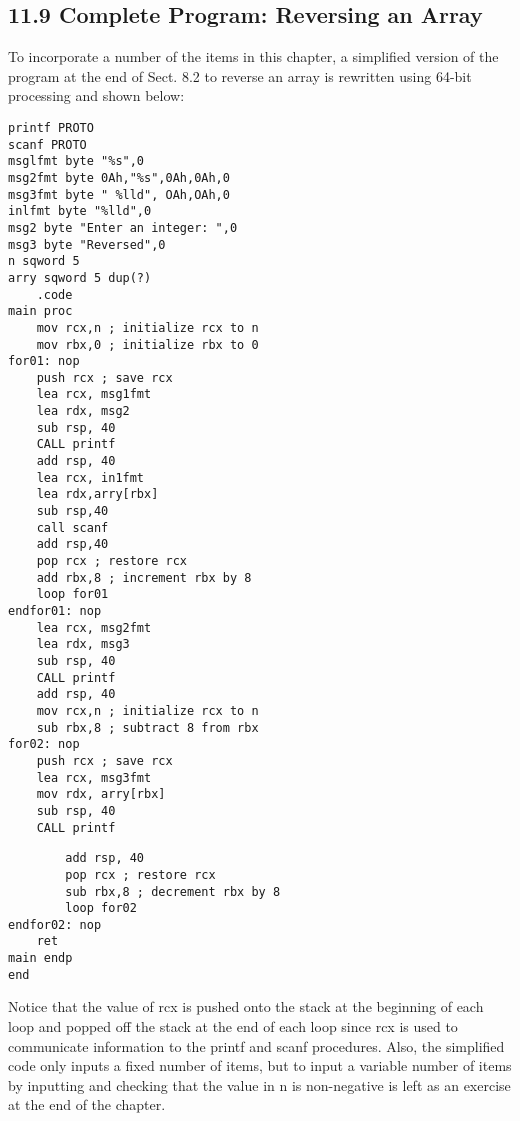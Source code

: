 \documentclass[10pt]{article}
\begin{document}
\subsection*{11.9 Complete Program: Reversing an Array}
To incorporate a number of the items in this chapter, a simplified version of the program at the end of Sect. 8.2 to reverse an array is rewritten using 64-bit processing and shown below:

\begin{verbatim}
printf PROTO
scanf PROTO
msglfmt byte "%s",0
msg2fmt byte 0Ah,"%s",0Ah,0Ah,0
msg3fmt byte " %lld", OAh,OAh,0
inlfmt byte "%lld",0
msg2 byte "Enter an integer: ",0
msg3 byte "Reversed",0
n sqword 5
arry sqword 5 dup(?)
    .code
main proc
    mov rcx,n ; initialize rcx to n
    mov rbx,0 ; initialize rbx to 0
for01: nop
    push rcx ; save rcx
    lea rcx, msg1fmt
    lea rdx, msg2
    sub rsp, 40
    CALL printf
    add rsp, 40
    lea rcx, in1fmt
    lea rdx,arry[rbx]
    sub rsp,40
    call scanf
    add rsp,40
    pop rcx ; restore rcx
    add rbx,8 ; increment rbx by 8
    loop for01
endfor01: nop
    lea rcx, msg2fmt
    lea rdx, msg3
    sub rsp, 40
    CALL printf
    add rsp, 40
    mov rcx,n ; initialize rcx to n
    sub rbx,8 ; subtract 8 from rbx
for02: nop
    push rcx ; save rcx
    lea rcx, msg3fmt
    mov rdx, arry[rbx]
    sub rsp, 40
    CALL printf
\end{verbatim}

\begin{verbatim}
        add rsp, 40
        pop rcx ; restore rcx
        sub rbx,8 ; decrement rbx by 8
        loop for02
endfor02: nop
    ret
main endp
end
\end{verbatim}

Notice that the value of rcx is pushed onto the stack at the beginning of each loop and popped off the stack at the end of each loop since rcx is used to communicate information to the printf and scanf procedures. Also, the simplified code only inputs a fixed number of items, but to input a variable number of items by inputting and checking that the value in n is non-negative is left as an exercise at the end of the chapter.
\end{document}
